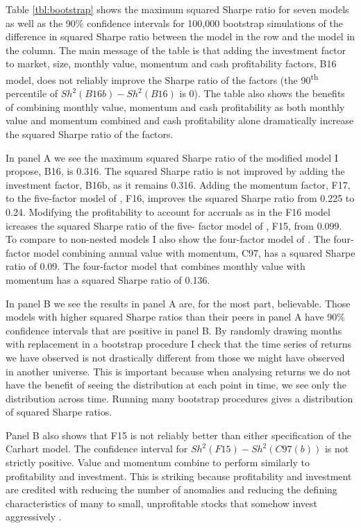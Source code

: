 
Table \ref{tbl:bootstrap} shows the maximum squared Sharpe ratio for seven models as well
as the 90\% confidence intervals for 100,000 bootstrap simulations of the difference in
squared Sharpe ratio between the model in the row and the model in the column. The main
message of the table is that adding the investment factor to market, size, monthly value,
momentum and cash profitability factors, B16 model, does not reliably improve the Sharpe
ratio of the factors (the 90\textsuperscript{th} percentile of $Sh^2(B16b)-Sh^2(B16)$ is
0). The table also shows the benefits of combining monthly value, momentum and cash
profitability as both monthly value and momentum combined and cash profitability alone
dramatically increase the squared Sharpe ratio of the factors.

In panel A we see the maximum squared Sharpe ratio of the modified
\textcite{ball2016accruals} model I propose, B16, is 0.316. The squared Sharpe ratio is
not improved by adding the investment factor, B16b, as it remains 0.316. Adding the
momentum factor, F17, to the five-factor model of \textcite{fama2016choosing}, F16,
improves the squared Sharpe ratio from 0.225 to 0.24. Modifying the profitability to
account for accruals as in the F16 model icreases the squared Sharpe ratio of the five-
factor model of \textcite{fama2015five}, F15, from 0.099. To compare to non-nested models
I also show the four-factor model of \textcite{carhart1997persistence}. The four-factor
model combining annual value with momentum, C97, has a squared Sharpe ratio of 0.09. The
four-factor model that combines monthly value with momentum has a squared Sharpe ratio of
0.136.

In panel B we see the results in panel A are, for the most part, believable. Those models
with higher squared Sharpe ratios than their peers in panel A have 90\% confidence
intervals that are positive in panel B. By randomly drawing months with replacement in a
bootstrap procedure I check that the time series of returns we have observed is not
drastically different from those we might have observed in another universe. This is
important because when analysing returns we do not have the benefit of seeing the
distribution at each point in time, we see only the distribution across time. Running many
bootstrap procedures gives a distribution of squared Sharpe ratios.

Panel B also shows that F15 is not reliably better than either specification of the
Carhart model. The confidence interval for $Sh^2(F15)-Sh^2(C97(b))$ is not strictly
positive. Value and momentum combine to perform similarly to profitability and investment.
This is striking because profitability and investment are credited with reducing the
number of anomalies and reducing the defining characteristics of many to small,
unprofitable stocks that somehow invest aggressively \parencite{fama2015five,
fama2016dissecting}.
